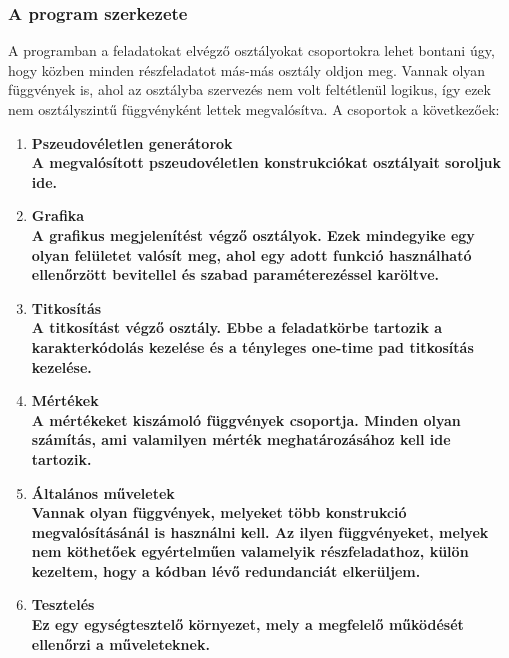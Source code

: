 \documentclass[hidelinks, 12pt]{article}
\begin{document}
\subsubsection{A program szerkezete}
A programban a feladatokat elvégző osztályokat csoportokra lehet bontani úgy, hogy közben minden részfeladatot más-más osztály oldjon meg. Vannak olyan függvények is, ahol az osztályba szervezés nem volt feltétlenül logikus, így ezek nem osztályszintű függvényként lettek megvalósítva. A csoportok a következőek:
\begin{enumerate}
	\item \bfseries Pszeudovéletlen generátorok \\
	\normalfont A megvalósított pszeudovéletlen konstrukciókat osztályait soroljuk ide.
	\item \bfseries Grafika \\
	\normalfont A grafikus megjelenítést végző osztályok. Ezek mindegyike egy olyan felületet valósít meg, ahol egy adott funkció használható ellenőrzött bevitellel és szabad paraméterezéssel karöltve.
	\item \bfseries Titkosítás \\
	\normalfont A titkosítást végző osztály. Ebbe a feladatkörbe tartozik a karakterkódolás kezelése és a tényleges one-time pad titkosítás kezelése.
	\item \bfseries Mértékek \\
	\normalfont A mértékeket kiszámoló függvények csoportja. Minden olyan számítás, ami valamilyen mérték meghatározásához kell ide tartozik.
	\item \bfseries Általános műveletek \\
	\normalfont Vannak olyan függvények, melyeket több konstrukció megvalósításánál is használni kell. Az ilyen függvényeket, melyek nem köthetőek egyértelműen valamelyik részfeladathoz, külön kezeltem, hogy a kódban lévő redundanciát elkerüljem.
	\item \bfseries Tesztelés \\
	\normalfont Ez egy egységtesztelő környezet, mely a megfelelő működését ellenőrzi a műveleteknek.
\end{enumerate}
\end{document}
